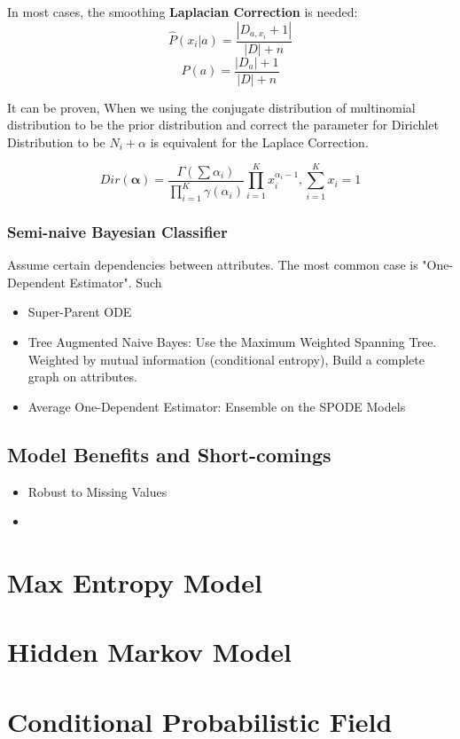 \documentclass[11pt, openany]{book}              %
\begin{document}
In most cases, the smoothing \textbf{Laplacian Correction} is needed:
$$\hat{P}(x_i|a) = \frac{|D_{a,x_i}+1|}{|D|+n}$$
$$\hat{P}(a) = \frac{|D_{a}|+1}{|D|+n}$$

It can be proven, When we using the conjugate distribution of multinomial distribution to be the prior distribution and correct the parameter for Dirichlet Distribution to be $N_i+\alpha$ is equivalent for the Laplace Correction.

$$Dir(\mathbf{\alpha}) = \frac{\Gamma(\sum\alpha_i)}{\prod_{i=1}^K \gamma(\alpha_i)} \prod_{i=1}^K x_i^{\alpha_i-1}, \sum_{i=1}^K x_i =1$$

\subsection{Semi-naive Bayesian Classifier}

Assume certain dependencies between attributes. The most common case is "One-Dependent Estimator". Such 

\begin{itemize}
	\item Super-Parent ODE
	\item Tree Augmented Naive Bayes: Use the Maximum Weighted Spanning Tree. Weighted by mutual information (conditional entropy), Build a complete graph on attributes. 
	\item Average One-Dependent Estimator: Ensemble on the SPODE Models 	
\end{itemize}

\section{Model Benefits and Short-comings}

\begin{itemize}
	\item Robust to Missing Values
	\item 
\end{itemize}

\chapter{Max Entropy Model}
\chapter{Hidden Markov Model}
\chapter{Conditional Probabilistic Field}
\end{document}
